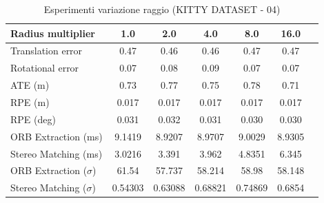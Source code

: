 \documentclass[12pt,a4paper]{report}
\begin{document}
\begin{table}[h]
    \centering
    \caption{Esperimenti variazione raggio (KITTY DATASET - 04) }
    \begin{tabular}{lcccccc}
        \toprule
        \rowcolor{gray!20}
        Radius multiplier & 1.0 & \cellcolor{orange!40}2.0 & 4.0 & 8.0 & 16.0 \\
        \midrule
        Translation error & 0.47 & \cellcolor{green!20}0.46 & \cellcolor{green!20}0.46 & 0.47 & 0.47 \\
        Rotational error  & \cellcolor{green!20}0.07 & 0.08 & 0.09 & \cellcolor{green!20}0.07 & \cellcolor{green!20}0.07 \\
        ATE (m)           & 0.73 & 0.77 & 0.75 & 0.78 & \cellcolor{green!20}0.71 \\
        RPE (m)           & \cellcolor{green!20}0.017 & \cellcolor{green!20}0.017 & \cellcolor{green!20}0.017 & \cellcolor{green!20}0.017 & \cellcolor{green!20}0.017 \\
        RPE (deg)         & 0.031 & 0.032 & 0.031 & \cellcolor{green!20}0.030 & \cellcolor{green!20}0.030 \\
        ORB Extraction (ms) & 9.1419 & \cellcolor{green!20}8.9207 & \cellcolor{green!20}8.9707 & 9.0029 & 8.9305 \\
        Stereo Matching (ms) & \cellcolor{green!20}3.0216 & 3.391 & 3.962 & 4.8351 & 6.345 \\
        ORB Extraction ($\sigma$) & 61.54 & \cellcolor{green!20}57.737 & 58.214 & 58.98 & 58.148 \\
        Stereo Matching ($\sigma$) & \cellcolor{green!20}0.54303 & 0.63088 & 0.68821 & 0.74869 & 0.6854 \\
        \bottomrule
    \end{tabular}
\end{table}
\end{document}
